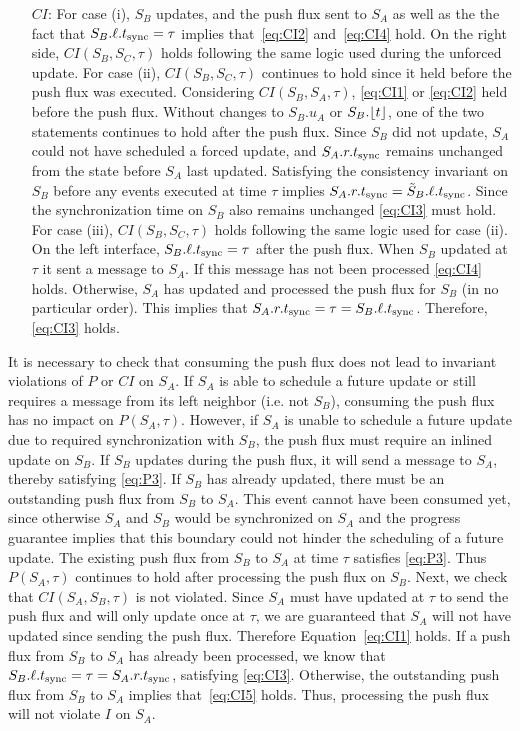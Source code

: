 \begin{enumerate}
    \item[$CI$:] For case (i), $S_B$ updates, and the push flux sent to $S_A$ as well as the the fact that $S_B.\ell.t_{\text{sync}}=\tau$ implies that~\eqref{eq:CI2} and~\eqref{eq:CI4} hold. On the right side, $CI(S_B, S_C, \tau)$ holds following the same logic used during the unforced update. For case (ii), 
    $CI(S_B,S_C,\tau)$ continues to hold since it held before the push flux was executed. Considering $CI(S_B,S_A,\tau)$, \eqref{eq:CI1} or \eqref{eq:CI2} held before the push flux. Without changes to $S_B.u_A$ or $S_B.\lfloor t \rfloor$, one of the two statements continues to hold after the push flux. 
    Since $S_B$ did not update, $S_A$ could not have scheduled a forced update, and $S_A.r.t_{\text{sync}}$ remains unchanged from the state before $S_A$ last updated. Satisfying the consistency invariant on $S_B$ before any events executed at time $\tau$ implies $S_A.r.t_{\text{sync}}=\tilde{S}_B.\ell.t_{\text{sync}}$. Since the synchronization time on $S_B$ also remains unchanged \eqref{eq:CI3} must hold.
    For case (iii), $CI(S_B,S_C,\tau)$ holds following the same logic used for case (ii). On the left interface, $S_B.\ell.t_{\text{sync}}=\tau$ after the push flux. When $S_B$ updated at $\tau$ it sent a message to $S_A$. If this message has not been processed \eqref{eq:CI4} holds. Otherwise, $S_A$ has updated and processed the push flux for $S_B$ (in no particular order). This implies that  $S_A.r.t_{\text{sync}}=\tau=S_B.\ell.t_{\text{sync}}$. Therefore, \eqref{eq:CI3} holds.
\end{enumerate}

It is necessary to check that consuming the push flux does not lead to invariant violations of $P$ or $CI$ on $S_A$.
If $S_A$ is able to schedule a future update or still requires a message from its left neighbor (i.e. not $S_B$), consuming the push flux has no impact on $P(S_A,\tau)$. However, if $S_A$ is unable to schedule a future update due to required synchronization with $S_B$, the push flux must require an inlined update on $S_B$. If $S_B$ updates during the push flux, it will send a message to $S_A$, thereby satisfying \eqref{eq:P3}. If $S_B$ has already updated, there must be an outstanding push flux from $S_B$ to $S_A$. This event cannot have been consumed yet, since otherwise $S_A$ and $S_B$ would be synchronized on $S_A$ and the progress guarantee implies that this boundary could not hinder the scheduling of a future update. The existing push flux from $S_B$ to $S_A$ at time $\tau$ satisfies \eqref{eq:P3}. Thus $P(S_A,\tau)$ continues to hold after processing the push flux on $S_B$. 
Next, we check that $CI(S_A,S_B,\tau)$ is not violated. Since $S_A$ must have updated at $\tau$ to send the push flux and will only update once at $\tau$, we are guaranteed that $S_A$ will not have updated since sending the push flux. Therefore Equation~\eqref{eq:CI1} holds. If a push flux from $S_B$ to $S_A$ has already been processed, we know that $S_B.\ell.t_{\text{sync}} = \tau = S_A.r.t_{\text{sync}}$, satisfying \eqref{eq:CI3}. Otherwise, the outstanding push flux from $S_B$ to $S_A$ implies that~\eqref{eq:CI5} holds. Thus, processing the push flux will not violate $I$ on $S_A$.

